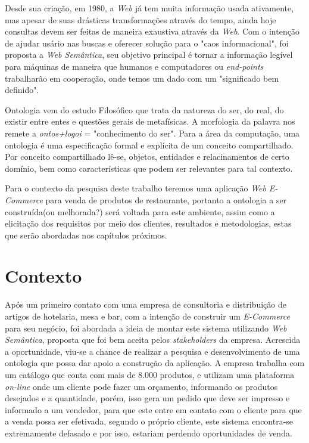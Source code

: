 Desde sua criação, em 1980, a \textit{Web} já tem muita informação usada ativamente, mas apesar de suas drásticas transformações através do tempo, ainda hoje consultas devem ser feitas de maneira exaustiva através da \textit{Web}. Com o intenção de ajudar usário nas buscas e oferecer solução para o "caos informacional", foi proposta a \textit{Web Semântica}, seu objetivo principal é tornar a informação legível para máquinas de maneira que humanos e computadores ou \textit{end-points} trabalharão em cooperação, onde temos um dado com um "significado bem definido"\cite{berners:2001}.

Ontologia vem do estudo Filosófico que trata da natureza do ser, do real, do existir entre entes e questões gerais de metafísicas. A morfologia da palavra nos remete a \textit{ontos+logoi} = "conhecimento do ser". Para a área da computação, uma ontologia é uma especificação formal e explícita de um conceito compartilhado. Por conceito compartilhado lê-se, objetos, entidades e relacinamentos de certo domínio, bem como características que podem ser relevantes para tal contexto\cite{gruber:1992}. 

Para o contexto da pesquisa deste trabalho teremos uma aplicação \textit{Web} \textit{E-Commerce} para venda de produtos de restaurante, portanto a ontologia a ser construída(ou melhorada?) será voltada para este ambiente, assim como a elicitação dos requisitos por meio dos clientes, resultados e metodologias, estas que serão abordadas nos capítulos próximos.

\section{Contexto}

Após um primeiro contato com uma empresa de consultoria e distribuição de artigos de hotelaria, mesa e bar, com a intenção de construir um \textit{E-Commerce} para seu negócio, foi abordada a ideia de montar este sistema utilizando \textit{Web Semântica}, proposta que foi bem aceita pelos \textit{stakeholders} da empresa. Acrescida a oportunidade, viu-se a chance de realizar a pesquisa e desenvolvimento de uma ontologia que possa dar apoio a construção da aplicação. A empresa trabalha com um catálogo que conta com mais de 8.000 produtos, e utilizam uma plataforma \textit{on-line} onde um cliente pode fazer um orçamento, informando os produtos desejados e a quantidade, porém, isso gera um pedido que deve ser impresso e informado a um vendedor, para que este entre em contato com o cliente para que a venda possa ser efetivada, segundo o próprio cliente, este sistema encontra-se extremamente defasado e por isso, estariam perdendo oportunidades de venda.

